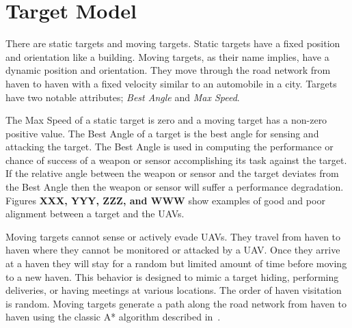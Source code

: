 \chapter{Target Model}
There are static targets and moving targets.  Static targets have a fixed position and orientation like a building.  Moving targets, as their name implies, have a dynamic position and orientation.  They move through the road network from haven to haven with a fixed velocity similar to an automobile in a city.  Targets have two notable attributes; \textit{Best Angle} and \textit{Max Speed}.

The Max Speed of a static target is zero and a moving target has a non-zero positive value.  The Best Angle of a target is the best angle for sensing and attacking the target.  The Best Angle is used in computing the performance or chance of success of a weapon or sensor accomplishing its task against the target.  If the relative angle between the weapon or sensor and the target deviates from the Best Angle then the weapon or sensor will suffer a performance degradation.  Figures \textbf{XXX, YYY, ZZZ, and WWW} show examples of good and poor alignment between a target and the UAVs.


Moving targets cannot sense or actively evade UAVs.  They travel from haven to haven where they cannot be monitored or attacked by a UAV.  Once they arrive at a haven they will stay for a random but limited amount of time before moving to a new haven.  This behavior is designed to mimic a target hiding, performing deliveries, or having meetings at various locations.  The order of haven visitation is random.  Moving targets generate a path along the road network from haven to haven using the classic A* algorithm described in~\cite{wiki:astar}.

